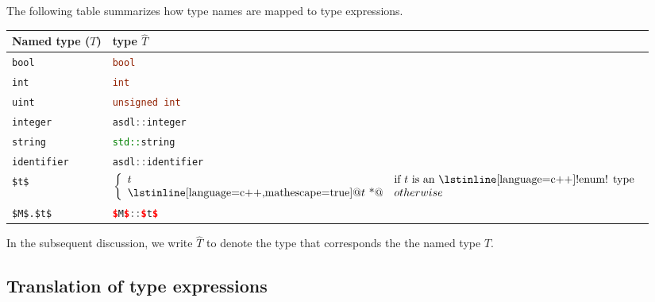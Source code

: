 The following table summarizes how type names are mapped to \Cplusplus{} type expressions.
%
\begin{center}
  \begin{tabular}{|p{2in}|p{3in}|}
    \hline
      \textbf{Named \asdl{} type ($T$)} &  \textbf{\Cplusplus{} type $\widehat{T}$} \\
    \hline
      \lstinline!bool! & \lstinline[language=c++]!bool! \\[0.5em]
      \lstinline!int! & \lstinline[language=c++]!int! \\[0.5em]
      \lstinline!uint! & \lstinline[language=c++]!unsigned int! \\[0.5em]
      \lstinline!integer! & \lstinline[language=c++]!asdl::integer! \\[0.5em]
      \lstinline!string! & \lstinline[language=c++]!std::string! \\[0.5em]
      \lstinline!identifier! & \lstinline[language=c++]!asdl::identifier! \\[0.5em]
      \lstinline[language=ASDL,mathescape=true]@$t$@ &
        $\left\{
        \begin{array}{ll}
          t & \text{if $t$ is an \lstinline[language=c++]!enum! type} \\
          \text{\lstinline[language=c++,mathescape=true]@$t$ *@} & otherwise \\
        \end{array}
        \right.$ \\[0.5em]
      \lstinline[language=ASDL,mathescape=true]@$M$.$t$@ & \lstinline[language=c++,mathescape=true]@$M$::$t$@ \\[0.5em]
    \hline
  \end{tabular}%
\end{center}%
%
In the subsequent discussion, we write $\widehat{T}$ to denote the \Cplusplus{} type
that corresponds the the \asdl{} named type $T$.

\subsection{Translation of type expressions}

